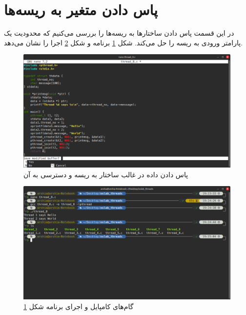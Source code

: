 \documentclass[12pt]{article}
\begin{document}
	\section{پاس دادن متغیر به ریسه‌ها}
	در این قسمت پاس دادن ساختار‌ها به ریسه‌ها را بررسی می‌کنیم که محدودیت یک پارامتر ورودی به ریسه را حل می‌کند. شکل \ref{img:15} برنامه و شکل \ref{img:16} اجرا را نشان می‌دهد.
	\begin{figure}[H]
		\centering
		\includegraphics[width=\textwidth]{report7-resources/15.png}
		\caption{پاس دادن داده در غالب ساختار به ریسه و دسترسی به آن}
		\label{img:15}
	\end{figure}
	\begin{figure}[H]
		\centering
		\includegraphics[width=\textwidth]{report7-resources/16.png}
		\caption{گام‌های کامپایل و اجرای برنامه شکل \ref{img:15}}
		\label{img:16}
	\end{figure}
        
	\newpage
	\begin{LTR}
		\printbibliography[title={مراجع}]
	\end{LTR}

	
\end{document}

